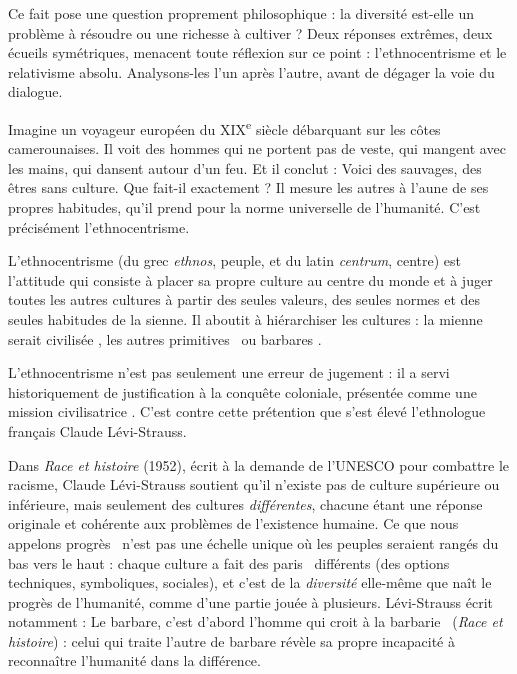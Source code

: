 \documentclass[11pt]{article}
\newcommand{\cle}[1]{{\popxbold\color{popdark}#1}}
\newcounter{popsec}
\newcounter{popsub}
\newcommand{\courssub}[1]{%
  \stepcounter{popsub}%
  \par\vspace{9pt}\noindent{\popxbold\fontsize{11.5}{13}\selectfont\color{popink}{\color{poporange}\thepopsec.\thepopsub}\hspace{6pt}#1}\par\nopagebreak\vspace{4pt}
}
\begin{document}
Ce fait pose une question proprement philosophique : la diversité est-elle un \cle{problème} à résoudre ou une \cle{richesse} à cultiver ? Deux réponses extrêmes, deux écueils symétriques, menacent toute réflexion sur ce point : l'\cle{ethnocentrisme} et le \cle{relativisme absolu}. Analysons-les l'un après l'autre, avant de dégager la voie du dialogue.

\courssub{Premier écueil : l'ethnocentrisme}

Imagine un voyageur européen du XIX\textsuperscript{e} siècle débarquant sur les côtes camerounaises. Il voit des hommes qui ne portent pas de veste, qui mangent avec les mains, qui dansent autour d'un feu. Et il conclut : \guillemotleft Voici des sauvages, des êtres sans culture. \guillemotright Que fait-il exactement ? Il mesure les autres à l'aune de ses propres habitudes, qu'il prend pour la norme universelle de l'humanité. C'est précisément l'ethnocentrisme.

\begin{definition}[L'ethnocentrisme]
L'\cle{ethnocentrisme} (du grec \emph{ethnos}, peuple, et du latin \emph{centrum}, centre) est l'attitude qui consiste à placer sa propre culture au centre du monde et à juger toutes les autres cultures à partir des seules valeurs, des seules normes et des seules habitudes de la sienne. Il aboutit à hiérarchiser les cultures : la mienne serait \guillemotleft civilisée \guillemotright, les autres \guillemotleft primitives \guillemotright\ ou \guillemotleft barbares \guillemotright.
\end{definition}

L'ethnocentrisme n'est pas seulement une erreur de jugement : il a servi historiquement de justification à la conquête coloniale, présentée comme une \guillemotleft mission civilisatrice \guillemotright. C'est contre cette prétention que s'est élevé l'ethnologue français Claude Lévi-Strauss.

\begin{propriete}
Dans \emph{Race et histoire} (1952), écrit à la demande de l'UNESCO pour combattre le racisme, Claude Lévi-Strauss soutient qu'il n'existe pas de culture supérieure ou inférieure, mais seulement des cultures \emph{différentes}, chacune étant une réponse originale et cohérente aux problèmes de l'existence humaine. Ce que nous appelons \guillemotleft progrès \guillemotright\ n'est pas une échelle unique où les peuples seraient rangés du bas vers le haut : chaque culture a fait des \guillemotleft paris \guillemotright\ différents (des options techniques, symboliques, sociales), et c'est de la \emph{diversité} elle-même que naît le progrès de l'humanité, comme d'une partie jouée à plusieurs. Lévi-Strauss écrit notamment : \guillemotleft Le barbare, c'est d'abord l'homme qui croit à la barbarie \guillemotright\ (\emph{Race et histoire}) : celui qui traite l'autre de barbare révèle sa propre incapacité à reconnaître l'humanité dans la différence.
\end{propriete}
\end{document}
